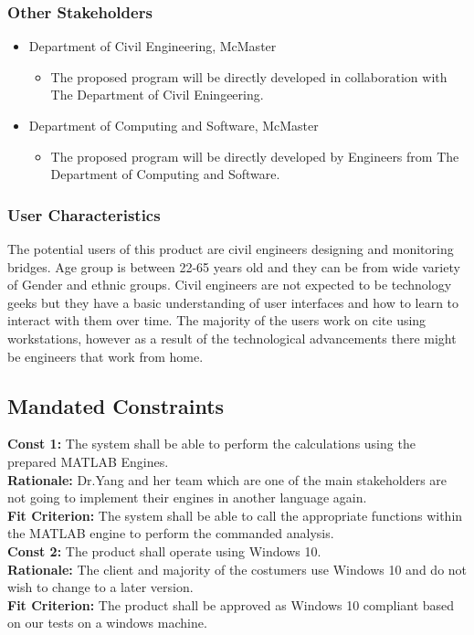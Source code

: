 \documentclass[12pt]{article}
\begin{document}
\subsubsection{Other Stakeholders}
\begin{itemize}
  \item Department of Civil Engineering, McMaster
		\begin{itemize}
	\item{The proposed program will be directly developed in collaboration with The Department of Civil Eningeering. }
		\end{itemize}
  \item Department of Computing and Software, McMaster 
		\begin{itemize}
	\item{The proposed program will be directly developed by Engineers from The Department of Computing and Software.} 
		\end{itemize}
\end{itemize}
\subsubsection{User Characteristics}
The potential users of this product are civil engineers designing and monitoring bridges. Age group is between 22-65 years old and they can be from wide variety of  Gender and ethnic groups. Civil engineers are not expected to be technology geeks but they have a basic understanding of user interfaces and how to learn to interact with them over time. The majority of the users work on cite using workstations, however as a result of the technological advancements there might be engineers that work from home.
\subsection{Mandated Constraints}
    \hspace{5mm} \textbf{Const 1:} The system shall be able to perform the calculations using the prepared MATLAB Engines. \\
    \textbf{Rationale:} Dr.Yang and her team which are one of the main stakeholders are not going to implement their engines in another language again.\\
    \textbf{Fit Criterion:} The system shall be able to call the appropriate functions within the MATLAB engine to perform the commanded analysis.\\

    \textbf{Const 2:} The product shall operate using Windows 10. \\
    \textbf{Rationale:} The client and majority of the costumers use Windows 10 and do not wish to change to a later version.\\
    \textbf{Fit Criterion:} The product shall be approved as Windows 10 compliant based on our tests on a windows machine.\\\\
\end{document}
